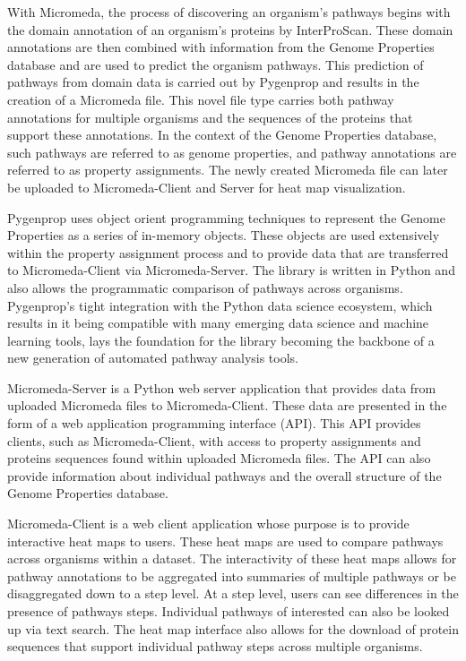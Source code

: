 With Micromeda, the process of discovering an organism's pathways begins with 
the domain annotation of an organism's proteins by InterProScan. These domain 
annotations are then combined with information from the Genome Properties 
database and are used to predict the organism pathways. This prediction of 
pathways from domain data is carried out by Pygenprop and results in the 
creation of a Micromeda file. This novel file type carries both pathway 
annotations for multiple organisms and the sequences of the proteins that 
support these annotations. In the context of the Genome Properties database, 
such pathways are referred to as genome properties, and pathway annotations are 
referred to as property assignments. The newly created Micromeda file can later 
be uploaded to Micromeda-Client and Server for heat map visualization.

Pygenprop uses object orient programming techniques to represent the Genome 
Properties as a series of in-memory objects. These objects are used extensively 
within the property assignment process and to provide data that are transferred 
to Micromeda-Client via Micromeda-Server. The library is written in Python and 
also allows the programmatic comparison of pathways across organisms. 
Pygenprop's tight integration with the Python data science ecosystem, which 
results in it being compatible with many emerging data science and machine 
learning tools, lays the foundation for the library becoming the backbone of a 
new generation of automated pathway analysis tools.

Micromeda-Server is a Python web server application that provides data from 
uploaded Micromeda files to Micromeda-Client. These data are presented in the form 
of a web application programming interface (API). This API provides clients, 
such as Micromeda-Client, with access to property assignments and proteins 
sequences found within uploaded Micromeda files. The API can also provide 
information about individual pathways and the overall structure of the Genome 
Properties database.

Micromeda-Client is a web client application whose purpose is to provide 
interactive heat maps to users. These heat maps are used to compare pathways 
across organisms within a dataset. The interactivity of these heat maps allows 
for pathway annotations to be aggregated into summaries of multiple pathways or 
be disaggregated down to a step level. At a step level, users can see 
differences in the presence of pathways steps. Individual pathways of interested 
can also be looked up via text search. The heat map interface also allows for 
the download of protein sequences that support individual pathway steps across 
multiple organisms.

